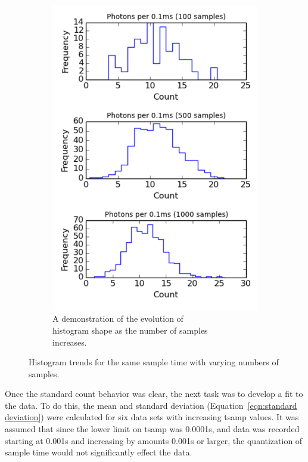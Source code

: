 \documentclass[a4paper,12pt]{article}
\begin{document}
\begin{figure}[h]
\begin{subfigure}{0.5\textwidth}
  \includegraphics[width=1\linewidth]{section6_crop.pdf}
  \captionsetup{justification=centering}
  \caption{A demonstration of the evolution of \\histogram shape as the number of samples \\increases.}
  \label{fig:section6}
\end{subfigure}%
\caption{Histogram trends for the same sample time with varying numbers of samples.}
\label{fig:histograms}
\end{figure}

Once the standard count behavior was clear, the next task was to develop a fit to the data. To do this, the mean and standard deviation (Equation~\ref{eqn:standard deviation}) were calculated for six data sets with increasing tsamp values. It was assumed that since the lower limit on tsamp was 0.0001s, and data was recorded starting at 0.001s and increasing by amounts 0.001s or larger, the quantization of sample time would not significantly effect the data.
\end{document}
